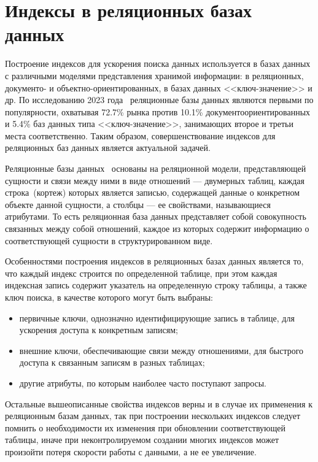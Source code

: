\section{Индексы в реляционных базах данных}

Построение индексов для ускорения поиска данных используется в базах данных с
различными моделями представления хранимой информации: в реляционных, документо-
и объектно-ориентированных, в базах данных <<ключ-значение>> и др. По
исследованию 2023 года~\cite{popularity} реляционные базы данных являются
первыми по популярности, охватывая 72.7\% рынка против 10.1\%
документоориентированных и 5.4\% баз данных типа <<ключ-значение>>, занимающих
второе и третьи места соответственно. Таким образом, совершенствование индексов
для реляционных баз данных является актуальной задачей.

Реляционные базы данных~\cite{halimon} основаны на реляционной модели,
представляющей сущности и связи между ними в виде отношений — двумерных таблиц,
каждая строка~(кортеж) которых является записью, содержащей данные о конкретном
объекте данной сущности, а столбцы — ее свойствами, называющиеся атрибутами. То
есть реляционная база данных представляет собой совокупность связанных между
собой отношений, каждое из которых содержит информацию о соответствующей
сущности в структурированном виде.

Особенностями построения индексов в реляционных базах данных является то, что
каждый индекс строится по определенной таблице, при этом каждая индексная запись
содержит  указатель на определенную строку таблицы, а также ключ поиска, в
качестве которого могут быть выбраны:

\begin{itemize}
    \item первичные ключи, однозначно идентифицирующие запись в таблице, для
    ускорения доступа к конкретным записям;
    \item внешние ключи, обеспечивающие связи между отношениями, для быстрого
    доступа к связанным записям в разных таблицах;
    \item другие атрибуты, по которым наиболее часто поступают запросы.
\end{itemize}

Остальные вышеописанные свойства индексов верны и в случае их применения к
реляционным базам данных, так при построении нескольких индексов следует помнить
о необходимости их изменения при обновлении соответствующей таблицы, иначе при
неконтролируемом создании многих индексов может произойти потеря скорости работы
с данными, а не ее увеличение.

